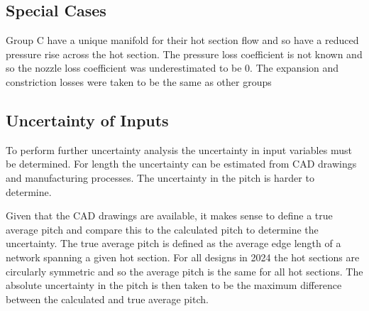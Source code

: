 \documentclass{article}
\begin{document}
\subsection{Special Cases}

Group C have a unique manifold for their hot section flow and so have a reduced pressure rise across the hot section.
The pressure loss coefficient is not known and so the nozzle loss coefficient was underestimated to be 0.
The expansion and constriction losses were taken to be the same as other groups 

\subsection{Uncertainty of Inputs}

To perform further uncertainty analysis the uncertainty in input variables must be determined.
For length the uncertainty can be estimated from CAD drawings and manufacturing processes.
The uncertainty in the pitch is harder to determine.

Given that the CAD drawings are available, it makes sense to define a true average pitch and compare this to the calculated pitch to determine the uncertainty.
The true average pitch is defined as the average edge length of a network spanning a given hot section.
For all designs in 2024 the hot sections are circularly symmetric and so the average pitch is the same for all hot sections.
The absolute uncertainty in the pitch is then taken to be the maximum difference between the calculated and true average pitch.
\end{document}
